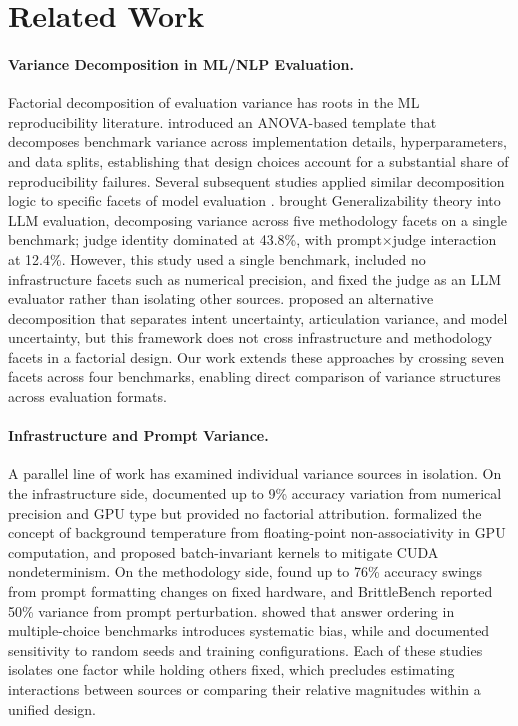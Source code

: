 \section{Related Work}
\label{sec:related}

\paragraph{Variance Decomposition in ML/NLP Evaluation.}
Factorial decomposition of evaluation variance has roots in the ML reproducibility literature. \citet{bouthillier2021accounting} introduced an ANOVA-based template that decomposes benchmark variance across implementation details, hyperparameters, and data splits, establishing that design choices account for a substantial share of reproducibility failures. Several subsequent studies applied similar decomposition logic to specific facets of model evaluation \citep{dodge2020finetuning, henderson2018deep, magnusson2023reproducibility}. \citet{mesting2026hidden} brought Generalizability theory into LLM evaluation, decomposing variance across five methodology facets on a single benchmark; judge identity dominated at 43.8\%, with prompt$\times$judge interaction at 12.4\%. However, this study used a single benchmark, included no infrastructure facets such as numerical precision, and fixed the judge as an LLM evaluator rather than isolating other sources. \citet{kunievsky2025intent} proposed an alternative decomposition that separates intent uncertainty, articulation variance, and model uncertainty, but this framework does not cross infrastructure and methodology facets in a factorial design. Our work extends these approaches by crossing seven facets across four benchmarks, enabling direct comparison of variance structures across evaluation formats.

\paragraph{Infrastructure and Prompt Variance.}
A parallel line of work has examined individual variance sources in isolation. On the infrastructure side, \citet{yuan2025layercast} documented up to 9\% accuracy variation from numerical precision and GPU type but provided no factorial attribution. \citet{messina2026background} formalized the concept of background temperature from floating-point non-associativity in GPU computation, and \citet{thinkingmachines2025batch} proposed batch-invariant kernels to mitigate CUDA nondeterminism. On the methodology side, \citet{sclar2024formatting} found up to 76\% accuracy swings from prompt formatting changes on fixed hardware, and BrittleBench \citep{brittlebench2026} reported 50\% variance from prompt perturbation. \citet{pezeshkpour2024ordering} showed that answer ordering in multiple-choice benchmarks introduces systematic bias, while \citet{bui2025seeds} and \citet{biderman2024lessons} documented sensitivity to random seeds and training configurations. Each of these studies isolates one factor while holding others fixed, which precludes estimating interactions between sources or comparing their relative magnitudes within a unified design.

